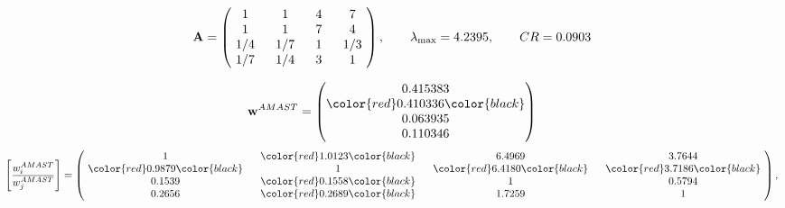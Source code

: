 \begin{example}
\begin{equation*}
\mathbf{A} =
\begin{pmatrix}
$\,\,$ 1 $\,\,$ & $\,\,$1$\,\,$ & $\,\,$4$\,\,$ & $\,\,$7 $\,\,$ \\
$\,\,$ 1 $\,\,$ & $\,\,$ 1 $\,\,$ & $\,\,$7$\,\,$ & $\,\,$4 $\,\,$ \\
$\,\,$ 1/4$\,\,$ & $\,\,$ 1/7$\,\,$ & $\,\,$ 1 $\,\,$ & $\,\,$ 1/3 $\,\,$ \\
$\,\,$ 1/7$\,\,$ & $\,\,$ 1/4$\,\,$ & $\,\,$3$\,\,$ & $\,\,$ 1  $\,\,$ \\
\end{pmatrix},
\qquad
\lambda_{\max} =
4.2395,
\qquad
CR = 0.0903
\end{equation*}

\begin{equation*}
\mathbf{w}^{AMAST} =
\begin{pmatrix}
0.415383\\
\color{red} 0.410336\color{black} \\
0.063935\\
0.110346
\end{pmatrix}\end{equation*}
\begin{equation*}
\left[ \frac{{w}^{AMAST}_i}{{w}^{AMAST}_j} \right] =
\begin{pmatrix}
$\,\,$ 1 $\,\,$ & $\,\,$\color{red} 1.0123\color{black} $\,\,$ & $\,\,$6.4969$\,\,$ & $\,\,$3.7644$\,\,$ \\
$\,\,$\color{red} 0.9879\color{black} $\,\,$ & $\,\,$ 1 $\,\,$ & $\,\,$\color{red} 6.4180\color{black} $\,\,$ & $\,\,$\color{red} 3.7186\color{black}   $\,\,$ \\
$\,\,$0.1539$\,\,$ & $\,\,$\color{red} 0.1558\color{black} $\,\,$ & $\,\,$ 1 $\,\,$ & $\,\,$0.5794 $\,\,$ \\
$\,\,$0.2656$\,\,$ & $\,\,$\color{red} 0.2689\color{black} $\,\,$ & $\,\,$1.7259$\,\,$ & $\,\,$ 1  $\,\,$ \\
\end{pmatrix},
\end{equation*}


\end{example}
